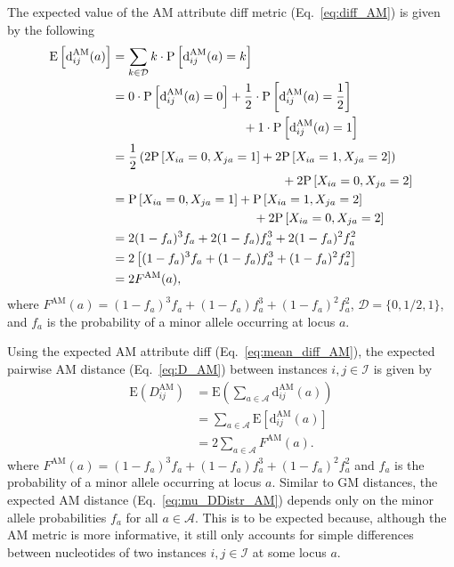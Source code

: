 \documentclass[aoas]{imsart}
\begin{document}
The expected value of the AM attribute diff metric (Eq.~\ref{eq:diff_AM}) is given by the following
%
\begin{equation}\label{eq:mean_diff_AM}
\begin{aligned}
\text{E}\left[\text{d}^\text{AM}_{ij}(a)\right] &= \sum_{k \in \mathcal{D}} k \cdot \text{P}\left[\text{d}^\text{AM}_{ij}(a) = k\right] \\
&= 0 \cdot \text{P}\left[\text{d}^\text{AM}_{ij}(a) = 0\right] + \frac{1}{2} \cdot \text{P}\left[\text{d}^\text{AM}_{ij}(a) = \frac{1}{2}\right] \\
&\hspace{3.7cm}+ 1 \cdot \text{P}\left[\text{d}^\text{AM}_{ij}(a) = 1\right] \\
&= \frac{1}{2}\left(2 \text{P}\left[X_{ia} = 0, X_{ja} = 1\right] + 2 \text{P}\left[X_{ia} = 1, X_{ja} = 2\right]\right) \\
&\hspace{4.8cm}+ 2 \text{P}\left[X_{ia} = 0, X_{ja} = 2\right] \\
&= \text{P}\left[X_{ia} = 0, X_{ja} = 1\right] + \text{P}\left[X_{ia} = 1, X_{ja} = 2\right] \\
&\hspace{4cm}+ 2 \text{P}\left[X_{ia} = 0, X_{ja} = 2\right] \\
&= 2(1 - f_a)^3f_a + 2(1 - f_a)f^3_a + 2(1 - f_a)^2 f^2_a \\
&= 2\left[(1 - f_a)^3f_a + (1 - f_a)f^3_a + (1 - f_a)^2 f^2_a\right] \\
&= 2F^\text{AM}(a),
\end{aligned}
\end{equation}
%
where $F^\text{AM}(a) = (1 - f_a)^3f_a + (1 - f_a)f^3_a + (1 - f_a)^2 f^2_a$, $\mathcal{D} = \{0,1/2,1\}$, and $f_a$ is the probability of a minor allele occurring at locus $a$.

Using the expected AM attribute diff (Eq.~\ref{eq:mean_diff_AM}), the expected pairwise AM distance (Eq.~\ref{eq:D_AM}) between instances $i,j \in \mathcal{I}$ is given by
%
\begin{equation}\label{eq:mu_DDistr_AM}
\begin{aligned}
\text{E}\left(D^\text{AM}_{ij}\right) &= \text{E}\left(\sum_{a \in \mathcal{A}} \text{d}^\text{AM}_{ij}(a)\right) \\
&= \sum_{a \in \mathcal{A}} \text{E}\left[\text{d}^\text{AM}_{ij}(a)\right] \\
&= 2 \sum_{a \in \mathcal{A}} F^\text{AM}(a).
\end{aligned}
\end{equation}
%
where $F^\text{AM}(a) = (1 - f_a)^3f_a + (1 - f_a)f^3_a + (1 - f_a)^2 f^2_a$ and $f_a$ is the probability of a minor allele occurring at locus $a$. Similar to GM distances, the expected AM distance (Eq.~\ref{eq:mu_DDistr_AM}) depends only on the minor allele probabilities $f_a$ for all $a \in \mathcal{A}$. This is to be expected because, although the AM metric is more informative, it still only accounts for simple differences between nucleotides of two instances $i,j \in \mathcal{I}$ at some locus $a$.
\end{document}

